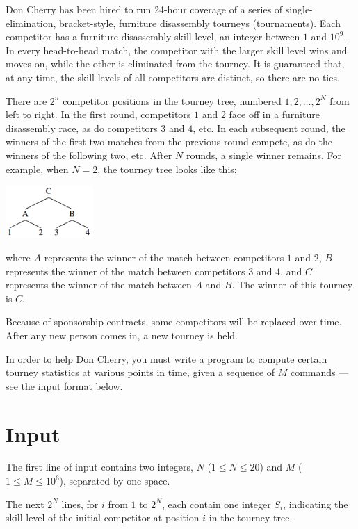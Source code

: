 
Don Cherry has been hired to run 24-hour coverage of a series of single-elimination, bracket-style, furniture disassembly tourneys (tournaments). Each competitor has a furniture disassembly skill level, an integer between $1$ and $10^9$. In every head-to-head match, the competitor with the larger skill level wins and moves on, while the other is eliminated from the tourney. It is guaranteed that, at any time, the skill levels of all competitors are distinct, so there are no ties.

There are $2^n$ competitor positions in the tourney tree, numbered $1, 2, \ldots, 2^N$ from left to right. In the first round, competitors $1$ and $2$ face off in a furniture disassembly race, as do competitors $3$ and $4$, etc. In each subsequent round, the winners of the first two matches from the previous round compete, as do the winners of the following two, etc. After $N$ rounds, a single winner remains. For example, when $N = 2$, the tourney tree looks like this:

\begin{center}
\includegraphics[width=0.25\textwidth]{ccc13s2p2_0}
\end{center}

where $A$ represents the winner of the match between competitors $1$ and $2$, $B$ represents the winner of the match between competitors $3$ and $4$, and $C$ represents the winner of the match between $A$ and $B$. The winner of this tourney is $C$.

Because of sponsorship contracts, some competitors will be replaced over time. After any new person comes in, a new tourney is held.

In order to help Don Cherry, you must write a program to compute certain tourney statistics at various points in time, given a sequence of $M$ commands --- see the input format below.

\section*{Input}
The first line of input contains two integers, $N$ ($1 \leq N \leq 20$) and $M$ ($1 \leq M \leq 10^6$), separated by one space.

The next $2^N$ lines, for $i$ from $1$ to $2^N$, each contain one integer $S_i$, indicating the skill level of the initial competitor at position $i$ in the tourney tree.

